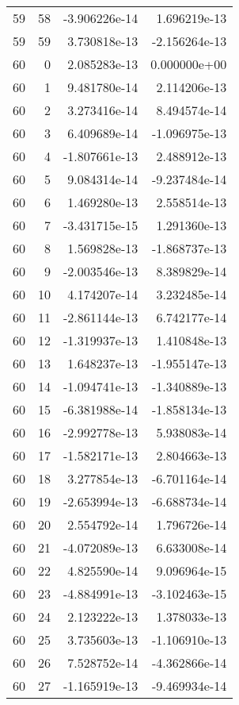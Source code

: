 \begin{tabular}{rrrr}
  59 &   58 & -3.906226e-14 &  1.696219e-13 \\
  59 &   59 &  3.730818e-13 & -2.156264e-13 \\
  60 &    0 &  2.085283e-13 &  0.000000e+00 \\
  60 &    1 &  9.481780e-14 &  2.114206e-13 \\
  60 &    2 &  3.273416e-14 &  8.494574e-14 \\
  60 &    3 &  6.409689e-14 & -1.096975e-13 \\
  60 &    4 & -1.807661e-13 &  2.488912e-13 \\
  60 &    5 &  9.084314e-14 & -9.237484e-14 \\
  60 &    6 &  1.469280e-13 &  2.558514e-13 \\
  60 &    7 & -3.431715e-15 &  1.291360e-13 \\
  60 &    8 &  1.569828e-13 & -1.868737e-13 \\
  60 &    9 & -2.003546e-13 &  8.389829e-14 \\
  60 &   10 &  4.174207e-14 &  3.232485e-14 \\
  60 &   11 & -2.861144e-13 &  6.742177e-14 \\
  60 &   12 & -1.319937e-13 &  1.410848e-13 \\
  60 &   13 &  1.648237e-13 & -1.955147e-13 \\
  60 &   14 & -1.094741e-13 & -1.340889e-13 \\
  60 &   15 & -6.381988e-14 & -1.858134e-13 \\
  60 &   16 & -2.992778e-13 &  5.938083e-14 \\
  60 &   17 & -1.582171e-13 &  2.804663e-13 \\
  60 &   18 &  3.277854e-13 & -6.701164e-14 \\
  60 &   19 & -2.653994e-13 & -6.688734e-14 \\
  60 &   20 &  2.554792e-14 &  1.796726e-14 \\
  60 &   21 & -4.072089e-13 &  6.633008e-14 \\
  60 &   22 &  4.825590e-14 &  9.096964e-15 \\
  60 &   23 & -4.884991e-13 & -3.102463e-15 \\
  60 &   24 &  2.123222e-13 &  1.378033e-13 \\
  60 &   25 &  3.735603e-13 & -1.106910e-13 \\
  60 &   26 &  7.528752e-14 & -4.362866e-14 \\
  60 &   27 & -1.165919e-13 & -9.469934e-14 \\

\end{tabular}
